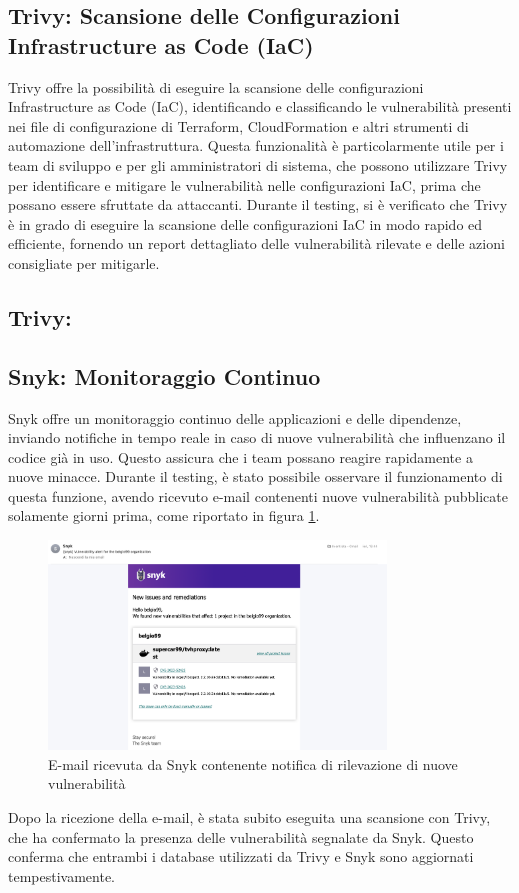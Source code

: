 \subsection{Trivy: Scansione delle Configurazioni Infrastructure as Code (IaC)}
Trivy offre la possibilità di eseguire la scansione delle configurazioni Infrastructure as Code (IaC), identificando e classificando le vulnerabilità presenti nei file di configurazione di Terraform, CloudFormation e altri strumenti di automazione dell'infrastruttura. Questa funzionalità è particolarmente utile per i team di sviluppo e per gli amministratori di sistema, che possono utilizzare Trivy per identificare e mitigare le vulnerabilità nelle configurazioni IaC, prima che possano essere sfruttate da attaccanti. Durante il testing, si è verificato che Trivy è in grado di eseguire la scansione delle configurazioni IaC in modo rapido ed efficiente, fornendo un report dettagliato delle vulnerabilità rilevate e delle azioni consigliate per mitigarle.
\subsection{Trivy: }

\subsection{Snyk: Monitoraggio Continuo}
Snyk offre un monitoraggio continuo delle applicazioni e delle dipendenze, inviando notifiche in tempo reale in caso di nuove vulnerabilità che influenzano il codice già in uso. Questo assicura che i team possano reagire rapidamente a nuove minacce. Durante il testing, è stato possibile osservare il funzionamento di questa funzione, avendo ricevuto e-mail contenenti nuove vulnerabilità pubblicate solamente giorni prima, come riportato in figura \ref{fig:snyk_email}.

\begin{figure}[H]
   \centering
   \includegraphics[width=0.8\textwidth]{immagini/capitolo2/snyk_email.png}
   \caption{E-mail ricevuta da Snyk contenente notifica di rilevazione di nuove vulnerabilità}
   \label{fig:snyk_email}
\end{figure}

Dopo la ricezione della e-mail, è stata subito eseguita una scansione con Trivy, che ha confermato la presenza delle vulnerabilità segnalate da Snyk. Questo conferma che entrambi i database utilizzati da Trivy e Snyk sono aggiornati tempestivamente.